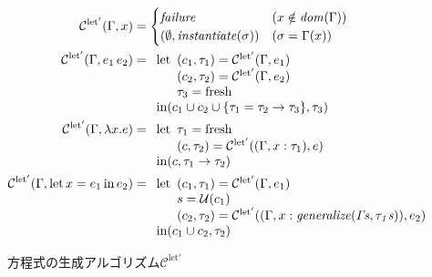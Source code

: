 \begin{figure}[htbp]
  \begin{align*}
    \mathcal C^\mathrm{let'}(\Gamma, x) &=
    \begin{cases}
      \mathit{failure}                          & (x \notin \mathit{dom}(\Gamma)) \\
      (\emptyset, \mathit{instantiate}(\sigma)) & (\sigma = \Gamma(x))
    \end{cases} \\
    \mathcal C^\mathrm{let'}(\Gamma, e_1 \, e_2) &=
    \begin{array}[t]{l}
      \mathrm{let}
        \begin{array}[t]{l}
          (c_1, \tau_1) = \mathcal C^\mathrm{let'}(\Gamma, e_1) \\
          (c_2, \tau_2) = \mathcal C^\mathrm{let'}(\Gamma, e_2) \\
          \tau_3 = \mathrm{fresh}
        \end{array} \\
      \mathrm{in} (c_1 \cup c_2 \cup \{\tau_1 = \tau_2 \to \tau_3\}, \tau_3)
    \end{array} \\
    \mathcal C^\mathrm{let'}(\Gamma, \lambda x . e) &=
    \begin{array}[t]{l}
      \mathrm{let}
        \begin{array}[t]{l}
          \tau_1 = \mathrm{fresh} \\
          (c, \tau_2) = \mathcal C^\mathrm{let'}((\Gamma, x : \tau_1), e)
        \end{array} \\
      \mathrm{in} (c, \tau_1 \to \tau_2)
    \end{array} \\
    \mathcal C^\mathrm{let'}(\Gamma, \mathrm{let} \, x = e_1 \, \mathrm{in} \, e_2) &=
    \begin{array}[t]{l}
      \mathrm{let}
        \begin{array}[t]{l}
          (c_1, \tau_1) = \mathcal C^\mathrm{let'}(\Gamma, e_1) \\
          s             = \mathcal U(c_1) \\
          (c_2, \tau_2) = \mathcal C^\mathrm{let'}((\Gamma, x : \mathit{generalize(\Gamma s, \tau_1 s)}) , e_2)
        \end{array} \\
      \mathrm{in} (c_1 \cup c_2, \tau_2)
    \end{array}
  \end{align*}
  \caption{方程式の生成アルゴリズム$\mathcal C^\mathrm{let'}$}
  \label{fig:algorithm-c-let2}
\end{figure}

